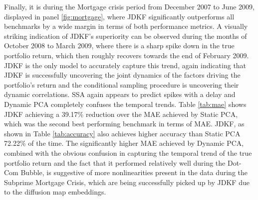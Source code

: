\documentclass[11pt]{article}
\theoremstyle{plain}
\theoremstyle{definition}
\theoremstyle{remark}
\numberwithin{equation}{section}
\begin{document}
Finally, it is during the Mortgage crisis period from December 2007 to June 2009, displayed in panel \ref{fig:mortgage}, where JDKF significantly outperforms all benchmarks by a wide margin in terms of both performance metrics. A visually striking indication of JDKF's superiority can be observed during the months of October 2008 to March 2009, where there is a sharp spike down in the true portfolio return, which then roughly recovers towards the end of February 2009. JDKF is the only model to accurately capture this trend, again indicating that JDKF is successfully uncovering the joint dynamics of the factors driving the portfolio's return and the conditional sampling procedure is uncovering their dynamic correlations. SSA again appears to predict spikes with a delay and Dynamic PCA completely confuses the temporal trends. Table \ref{tab:mae} shows JDKF achieving a 39.17\% reduction over the MAE achieved by Static PCA, which was the second best performing benchmark in terms of MAE. JDKF, as shown in Table \ref{tab:accuracy} also achieves higher accuracy than Static PCA 72.22\% of the time. The significantly higher MAE achieved by Dynamic PCA, combined with the obvious confusion in capturing the temporal trend of the true portfolio return and the fact that it performed relatively well during the Dot-Com Bubble, is suggestive of more nonlinearities present in the data during the Subprime Mortgage Crisis, which are being successfully picked up by JDKF due to the diffusion map embeddings. 
\end{document}
